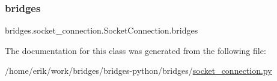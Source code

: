 \subsubsection{\texorpdfstring{bridges}{bridges}}
{\footnotesize\ttfamily bridges.\+socket\+\_\+connection.\+Socket\+Connection.\+bridges}



The documentation for this class was generated from the following file\+:\begin{DoxyCompactItemize}
\item 
/home/erik/work/bridges/bridges-\/python/bridges/\hyperlink{socket__connection_8py}{socket\+\_\+connection.\+py}\end{DoxyCompactItemize}
